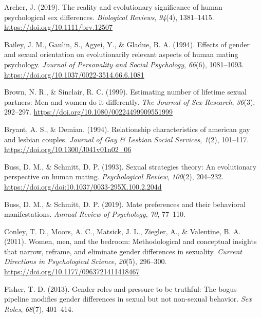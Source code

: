 \documentclass[
  11pt,
]{article}
\newlength{\cslhangindent}
\newlength{\cslentryspacingunit} %
\newenvironment{CSLReferences}[2] %
 {%
  \setlength{\parindent}{0pt}
  \ifodd #1
  \let\oldpar\par
  \def\par{\hangindent=\cslhangindent\oldpar}
  \fi
  \setlength{\parskip}{#2\cslentryspacingunit}
 }%
 {}
\begin{document}
\hypertarget{refs}{}
\begin{CSLReferences}{1}{0}
\leavevmode{}%
Archer, J. (2019). The reality and evolutionary significance of human
psychological sex differences. \emph{Biological Reviews}, \emph{94}(4),
1381--1415. \url{https://doi.org/10.1111/brv.12507}

\leavevmode{}%
Bailey, J. M., Gaulin, S., Agyei, Y., \& Gladue, B. A. (1994). Effects
of gender and sexual orientation on evolutionarily relevant aspects of
human mating psychology. \emph{Journal of Personality and Social
Psychology}, \emph{66}(6), 1081--1093.
\url{https://doi.org/10.1037/0022-3514.66.6.1081}

\leavevmode{}%
Brown, N. R., \& Sinclair, R. C. (1999). Estimating number of lifetime
sexual partners: Men and women do it differently. \emph{The Journal of
Sex Research}, \emph{36}(3), 292--297.
\url{https://doi.org/10.1080/00224499909551999}

\leavevmode{}%
Bryant, A. S., \& Demian. (1994). Relationship characteristics of
american gay and lesbian couples. \emph{Journal of Gay \& Lesbian Social
Services}, \emph{1}(2), 101--117.
\url{https://doi.org/10.1300/J041v01n02_06}

\leavevmode{}%
Buss, D. M., \& Schmitt, D. P. (1993). Sexual strategies theory: An
evolutionary perspective on human mating. \emph{Psychological Review},
\emph{100}(2), 204--232.
\url{https://doi.org/doi:10.1037/0033-295X.100.2.204d}

\leavevmode{}%
Buss, D. M., \& Schmitt, D. P. (2019). Mate preferences and their
behavioral manifestations. \emph{Annual Review of Psychology},
\emph{70}, 77--110.

\leavevmode{}%
Conley, T. D., Moors, A. C., Matsick, J. L., Ziegler, A., \& Valentine,
B. A. (2011). Women, men, and the bedroom: Methodological and conceptual
insights that narrow, reframe, and eliminate gender differences in
sexuality. \emph{Current Directions in Psychological Science},
\emph{20}(5), 296--300. \url{https://doi.org/10.1177/0963721411418467}

\leavevmode{}%
Fisher, T. D. (2013). Gender roles and pressure to be truthful: The
bogus pipeline modifies gender differences in sexual but not non-sexual
behavior. \emph{Sex Roles}, \emph{68}(7), 401--414.


\end{CSLReferences}
\end{document}
